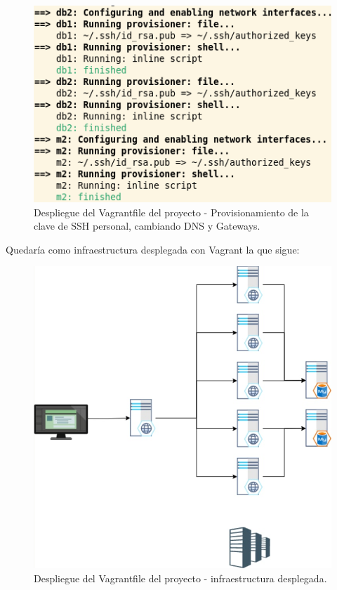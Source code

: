 \begin{figure}[H]
	\centering
	\includegraphics[scale=0.35]{img/vagrant5}
	\caption{Despliegue del Vagrantfile del proyecto - Provisionamiento de la clave de SSH personal, cambiando DNS y Gateways.}
\end{figure}

Quedaría como infraestructura desplegada con Vagrant la que sigue:

\begin{figure}[H]
	\centering
	\includegraphics[scale=0.35]{img/vagrant6}
	\caption{Despliegue del Vagrantfile del proyecto - infraestructura desplegada.}
\end{figure}

